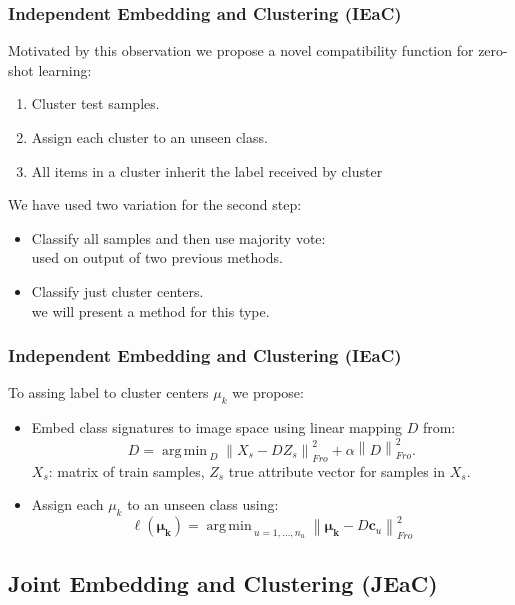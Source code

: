\documentclass{beamer}
\DeclareMathOperator*{\argmin}{arg\,min\,}
\newcommand{\normf}[1]{\left \lVert #1 \right \rVert_{Fro}}
\begin{document}
\begin{frame}\frametitle{Independent Embedding and Clustering (IEaC)}
  Motivated by this observation we propose a novel compatibility function for zero-shot learning:
  \begin{enumerate}
    \item Cluster test samples.
    \item Assign each cluster to an unseen class.
    \item All items in a cluster inherit the label received by cluster
  \end{enumerate}
  We have used two variation for the second step:
  \begin{itemize}
    \item Classify all samples and then use majority vote:
    \\ used on output of two previous methods.
    \item Classify just cluster centers.
    \\ we will present a method for this type.
  \end{itemize}
\end{frame}



\begin{frame}\frametitle{Independent Embedding and Clustering (IEaC)}
To assing label to cluster centers $\mu_k$ we propose:
\begin{itemize}
  \item Embed class signatures to image space using linear mapping $D$ from:
  \begin{equation} \label{eq:d_definition}
  D = \argmin_D \normf{X_s - D Z_s}^2 + \alpha \normf{D}^2.
\end{equation}
$X_s$: matrix of train samples, $Z_s$ true attribute vector for samples in $X_s.$
\item Assign each $\mu_k$ to an unseen class using:
\begin{equation}
\label{eq:simple_assignment}
\ell(\boldsymbol{\mu_k}) = \argmin_{u=1,\ldots,n_u} \normf{\boldsymbol{\mu_k} - D\mathbf{c}_{u}}^2
\end{equation}\end{itemize}
\end{frame}




\subsection{Joint Embedding and Clustering (JEaC)}
\label{sec:Joint Embedding and Clustering (JEaC)}
\end{document}
